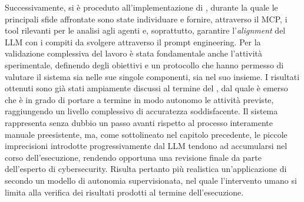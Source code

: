 

Successivamente, si è proceduto all'implementazione di \system{}, durante la quale le principali sfide affrontate sono state individuare e fornire, attraverso il MCP, i tool rilevanti per le analisi agli agenti e, soprattutto, garantire l'\emph{alignment} del LLM con i compiti da svolgere attraverso il prompt engineering. Per la validazione complessiva del lavoro è stata fondamentale anche l'attività sperimentale, definendo degli obiettivi e un protocollo che hanno permesso di valutare il sistema sia nelle sue singole componenti, sia nel suo insieme. I risultati ottenuti sono già stati ampiamente discussi al termine del , dal quale è emerso che \system{} è in grado di portare a termine in modo autonomo le attività previste, raggiungendo un livello complessivo di accuratezza soddisfacente. Il sistema rappresenta senza dubbio un passo avanti rispetto al processo interamente manuale preesistente, ma, come sottolineato nel capitolo precedente, le piccole imprecisioni introdotte progressivamente dal LLM tendono ad accumularsi nel corso dell'esecuzione, rendendo opportuna una revisione finale da parte dell'esperto di cybersecurity. Risulta pertanto più realistica un'applicazione di \system{} secondo un modello di autonomia supervisionata, nel quale l'intervento umano si limita alla verifica dei risultati prodotti al termine dell'esecuzione.



